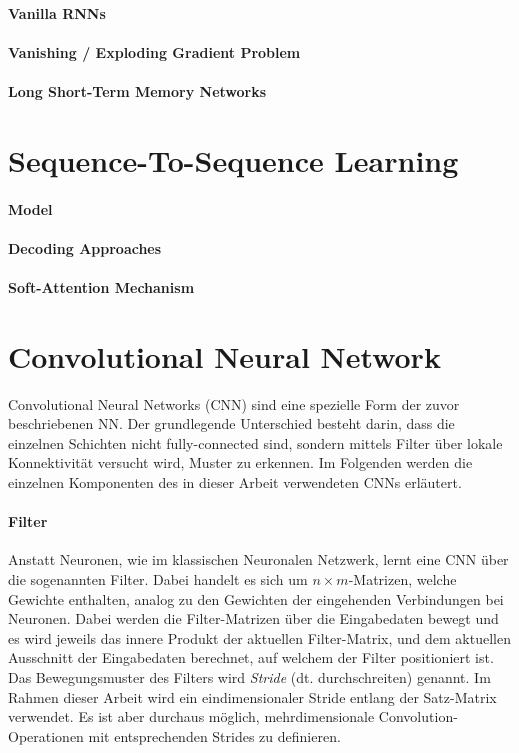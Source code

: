 \paragraph{Vanilla RNNs} \blindtext
\paragraph{Vanishing / Exploding Gradient Problem} \blindtext
\paragraph{Long Short-Term Memory Networks} \blindtext

\section{Sequence-To-Sequence Learning}
\paragraph{Model} \blindtext
\paragraph{Decoding Approaches} \blindtext
\paragraph{Soft-Attention Mechanism} \blindtext

\iffalse
\section{Convolutional Neural Network}
Convolutional Neural Networks (CNN) sind eine spezielle Form der zuvor beschriebenen NN. Der grundlegende Unterschied besteht darin, dass die einzelnen Schichten nicht fully-connected sind, sondern mittels Filter über lokale Konnektivität versucht wird, Muster zu erkennen. Im Folgenden werden die einzelnen Komponenten des in dieser Arbeit verwendeten CNNs erläutert.

\paragraph{Filter}\label{basic:cnn:filter} Anstatt Neuronen, wie im klassischen Neuronalen Netzwerk, lernt eine CNN über die sogenannten Filter. Dabei handelt es sich um $n\times m$-Matrizen, welche Gewichte enthalten, analog zu den Gewichten der eingehenden Verbindungen bei Neuronen. Dabei werden die Filter-Matrizen über die Eingabedaten bewegt und es wird jeweils das innere Produkt der aktuellen Filter-Matrix, und dem aktuellen Ausschnitt der Eingabedaten berechnet, auf welchem der Filter positioniert ist. Das Bewegungsmuster des Filters wird \emph{Stride} (dt. durchschreiten) genannt. Im Rahmen dieser Arbeit wird ein eindimensionaler Stride entlang der Satz-Matrix verwendet. Es ist aber durchaus möglich, mehrdimensionale Convolution-Operationen mit entsprechenden Strides zu definieren.

